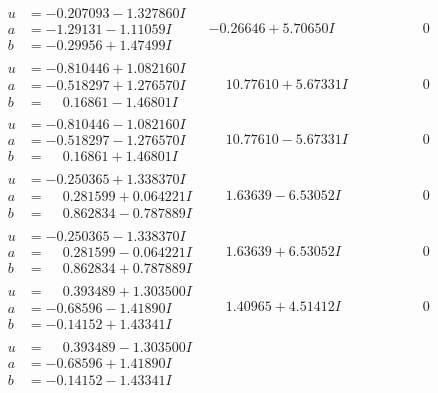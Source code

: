 \documentclass[1p]{elsarticle_modified}
\theoremstyle{definition}
\begin{document}
$$\begin{array}{c|c|c}
\begin{aligned}
u &= -0.207093 - 1.327860 I \\
a &= -1.29131 - 1.11059 I \\
b &= -0.29956 + 1.47499 I\end{aligned}
 & -0.26646 + 5.70650 I & \phantom{-0.000000 } 0 \\ \hline\begin{aligned}
u &= -0.810446 + 1.082160 I \\
a &= -0.518297 + 1.276570 I \\
b &= \phantom{-}0.16861 - 1.46801 I\end{aligned}
 & \phantom{-}10.77610 + 5.67331 I & \phantom{-0.000000 } 0 \\ \hline\begin{aligned}
u &= -0.810446 - 1.082160 I \\
a &= -0.518297 - 1.276570 I \\
b &= \phantom{-}0.16861 + 1.46801 I\end{aligned}
 & \phantom{-}10.77610 - 5.67331 I & \phantom{-0.000000 } 0 \\ \hline\begin{aligned}
u &= -0.250365 + 1.338370 I \\
a &= \phantom{-}0.281599 + 0.064221 I \\
b &= \phantom{-}0.862834 - 0.787889 I\end{aligned}
 & \phantom{-}1.63639 - 6.53052 I & \phantom{-0.000000 } 0 \\ \hline\begin{aligned}
u &= -0.250365 - 1.338370 I \\
a &= \phantom{-}0.281599 - 0.064221 I \\
b &= \phantom{-}0.862834 + 0.787889 I\end{aligned}
 & \phantom{-}1.63639 + 6.53052 I & \phantom{-0.000000 } 0 \\ \hline\begin{aligned}
u &= \phantom{-}0.393489 + 1.303500 I \\
a &= -0.68596 - 1.41890 I \\
b &= -0.14152 + 1.43341 I\end{aligned}
 & \phantom{-}1.40965 + 4.51412 I & \phantom{-0.000000 } 0 \\ \hline\begin{aligned}
u &= \phantom{-}0.393489 - 1.303500 I \\
a &= -0.68596 + 1.41890 I \\
b &= -0.14152 - 1.43341 I\end{aligned}

\end{array}$$
\end{document}

